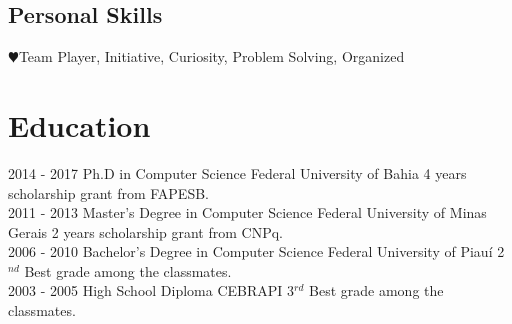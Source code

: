 \documentclass[nocolors]{friggeri-cv-a4}
\begin{document}
\begin{aside}
 \section{Personal Skills}
 {\color{red} $\varheartsuit$}Team Player,
 	Initiative,
 	Curiosity,
 	Problem Solving,
 	Organized
 ~
\end{aside}

\section{Education}
\begin{entrylist}
	\entry
	{2014 - 2017}
	{Ph.D in Computer Science}
	{Federal University of Bahia}
	{4 years scholarship grant from FAPESB.\\}
	\entry
	{2011 - 2013}
	{Master's Degree in Computer Science}
	{Federal University of Minas Gerais}
	{2 years scholarship grant from CNPq.\\}
	\entry
	{2006 - 2010}
	{Bachelor's Degree in Computer Science}
	{Federal University of Piauí}
	{2$^{nd}$ Best grade among the classmates.\\}
	\entry
	{2003 - 2005}
	{High School Diploma}
	{CEBRAPI}
	{3$^{rd}$ Best grade among the classmates.}
\end{entrylist}
\end{document}
